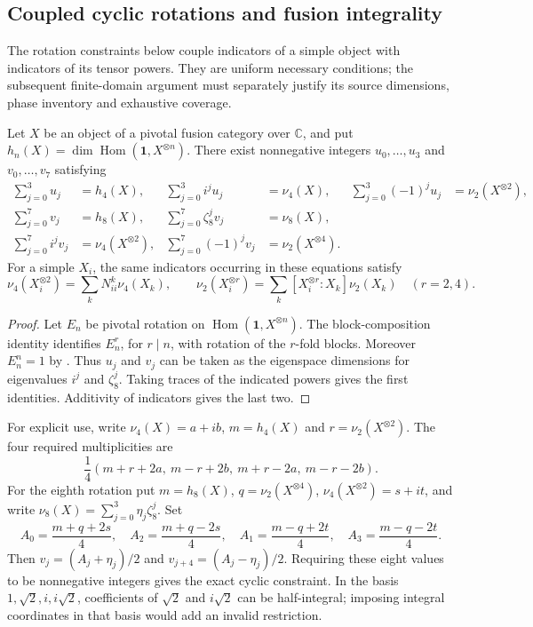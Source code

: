 \subsection{Coupled cyclic rotations and fusion integrality}
\label{sec:m5-cyclic-rotation}
The rotation constraints below couple indicators of a simple object with
indicators of its tensor powers.  They are uniform necessary conditions;
the subsequent finite-domain argument must separately justify its source
dimensions, phase inventory and exhaustive coverage.

\begin{proposition}
\label{prop:m5-cyclic-multiplicities}
Let $X$ be an object of a pivotal fusion category over $\mathbb C$, and
put $h_n(X)=\dim\operatorname{Hom}(\mathbf1,X^{\otimes n})$.
There exist nonnegative integers $u_0,\ldots,u_3$ and
$v_0,\ldots,v_7$ satisfying
\begin{align*}
 \sum_{j=0}^3u_j&=h_4(X),&
 \sum_{j=0}^3i^ju_j&=\nu_4(X),&
 \sum_{j=0}^3(-1)^ju_j&=\nu_2(X^{\otimes2}),\\
 \sum_{j=0}^7v_j&=h_8(X),&
 \sum_{j=0}^7\zeta_8^jv_j&=\nu_8(X),\\
 \sum_{j=0}^7i^jv_j&=\nu_4(X^{\otimes2}),&
 \sum_{j=0}^7(-1)^jv_j&=\nu_2(X^{\otimes4}).
\end{align*}
For a simple $X_i$, the same indicators occurring in these equations
satisfy
\[
 \nu_4(X_i^{\otimes2})=\sum_kN_{ii}^k\nu_4(X_k),\qquad
 \nu_2(X_i^{\otimes r})=\sum_k[X_i^{\otimes r}:X_k]\nu_2(X_k)
 \quad(r=2,4).
\]
\end{proposition}
\begin{proof}
Let $E_n$ be pivotal rotation on
$\operatorname{Hom}(\mathbf1,X^{\otimes n})$.
The block-composition identity
\cite[equation~(5.4)]{NgSchauenburgPivotal} identifies $E_n^r$,
for $r\mid n$, with rotation of the $r$-fold blocks.
Moreover $E_n^n=1$ by \cite[Theorem~5.1]{NgSchauenburgPivotal}.
Thus $u_j$ and $v_j$ can be taken as the eigenspace dimensions for
eigenvalues $i^j$ and $\zeta_8^j$. Taking traces of the indicated powers
gives the first identities. Additivity of indicators gives the last two.
\end{proof}

For explicit use, write $\nu_4(X)=a+ib$, $m=h_4(X)$ and
$r=\nu_2(X^{\otimes2})$.  The four required multiplicities are
\[
 \frac14(m+r+2a,\ m-r+2b,\ m+r-2a,\ m-r-2b).
\]
For the eighth rotation put $m=h_8(X)$, $q=\nu_2(X^{\otimes4})$,
$\nu_4(X^{\otimes2})=s+it$, and write
$\nu_8(X)=\sum_{j=0}^3\eta_j\zeta_8^j$.  Set
\[
 A_0=\frac{m+q+2s}{4},\quad A_2=\frac{m+q-2s}{4},\quad
 A_1=\frac{m-q+2t}{4},\quad A_3=\frac{m-q-2t}{4}.
\]
Then $v_j=(A_j+\eta_j)/2$ and $v_{j+4}=(A_j-\eta_j)/2$.
Requiring these eight values to be nonnegative integers gives the exact
cyclic constraint. In the basis $1,\sqrt2,i,i\sqrt2$, coefficients
of $\sqrt2$ and $i\sqrt2$ can be half-integral; imposing integral
coordinates in that basis would add an invalid restriction.

